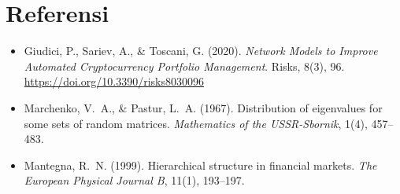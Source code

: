 \documentclass[12pt,a4paper]{article}
\begin{document}
\section*{Referensi}

\begin{itemize}
  \item Giudici, P., Sariev, A., \& Toscani, G. (2020).
        \textit{Network Models to Improve Automated Cryptocurrency Portfolio
        Management}. Risks, 8(3), 96.
        \url{https://doi.org/10.3390/risks8030096}

  \item Marchenko, V.~A., \& Pastur, L.~A. (1967).
        Distribution of eigenvalues for some sets of random matrices.
        \textit{Mathematics of the USSR-Sbornik}, 1(4), 457--483.

  \item Mantegna, R.~N. (1999).
        Hierarchical structure in financial markets.
        \textit{The European Physical Journal B}, 11(1), 193--197.
\end{itemize}
\end{document}
